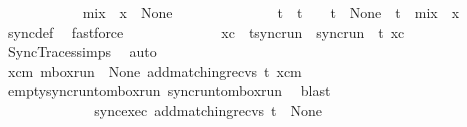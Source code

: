 \begin{isabellebody}
\ \ \ \ \ \ \ \ \ \ \isamarkupfalse%
\ {\isachardoublequoteopen}{\isacharquery}{\kern0pt}mix\ {\isasymsqdot}\ x{\isacharprime}{\kern0pt}\ {\isasymin}\ {\isasymT}\isactrlbsub None\isactrlesub {\isachardoublequoteclose}\ \isamarkupfalse%
\isanewline
\ \ \ \ \ \ \ \ \ \ \isamarkupfalse%
\ \isamarkupfalse%
\ t\ \ {\isachardoublequoteopen}t\ {\isasymin}\ {\isasymL}\isactrlsub {\isasymzero}\ {\isasymand}\ t\ {\isasymin}\ {\isasymT}\isactrlbsub None\isactrlesub {\isasymdownharpoonright}\isactrlsub {\isacharbang}{\kern0pt}\ {\isasymand}\ t\ {\isacharequal}{\kern0pt}\ {\isacharparenleft}{\kern0pt}{\isacharquery}{\kern0pt}mix\ {\isasymsqdot}\ x{\isacharprime}{\kern0pt}{\isacharparenright}{\kern0pt}{\isasymdown}\isactrlsub {\isacharbang}{\kern0pt}{\isachardoublequoteclose}\ \isamarkupfalse%
\ sync{\isacharunderscore}{\kern0pt}def\ \isamarkupfalse%
\ fastforce\isanewline
\ \ \ \ \ \ \ \ \ \ \isamarkupfalse%
\ \isamarkupfalse%
\ xc\ \ t{\isacharunderscore}{\kern0pt}sync{\isacharunderscore}{\kern0pt}run\ {\isacharcolon}{\kern0pt}\ {\isachardoublequoteopen}sync{\isacharunderscore}{\kern0pt}run\ {\isasymC}\isactrlsub {\isasymI}\isactrlsub {\isasymzero}\ t\ xc{\isachardoublequoteclose}\ \isamarkupfalse%
\ SyncTraces{\isachardot}{\kern0pt}simps\ \isamarkupfalse%
\ auto\isanewline
\ \ \ \ \ \ \ \ \ \ \ \ \ \ \isanewline
\ \ \ \ \ \ \ \ \ \ \isamarkupfalse%
\ \isamarkupfalse%
\ {\isachardoublequoteopen}{\isasymexists}xcm{\isachardot}{\kern0pt}\ mbox{\isacharunderscore}{\kern0pt}run\ {\isasymC}\isactrlsub {\isasymI}\isactrlsub {\isasymmm}\ None\ {\isacharparenleft}{\kern0pt}add{\isacharunderscore}{\kern0pt}matching{\isacharunderscore}{\kern0pt}recvs\ t{\isacharparenright}{\kern0pt}\ xcm{\isachardoublequoteclose}\ \isamarkupfalse%
\ empty{\isacharunderscore}{\kern0pt}sync{\isacharunderscore}{\kern0pt}run{\isacharunderscore}{\kern0pt}to{\isacharunderscore}{\kern0pt}mbox{\isacharunderscore}{\kern0pt}run\ sync{\isacharunderscore}{\kern0pt}run{\isacharunderscore}{\kern0pt}to{\isacharunderscore}{\kern0pt}mbox{\isacharunderscore}{\kern0pt}run\ \isamarkupfalse%
\ blast\isanewline
\ \ \ \ \ \ \ \ \ \ \ \ \ \ \isanewline
\ \ \ \ \ \ \ \ \ \ \isamarkupfalse%
\ \isamarkupfalse%
\ sync{\isacharunderscore}{\kern0pt}exec{\isacharcolon}{\kern0pt}\ {\isachardoublequoteopen}{\isacharparenleft}{\kern0pt}add{\isacharunderscore}{\kern0pt}matching{\isacharunderscore}{\kern0pt}recvs\ t{\isacharparenright}{\kern0pt}\ {\isasymin}\ {\isasymT}\isactrlbsub None\isactrlesub {\isachardoublequoteclose}\ \isamarkupfalse%

\end{isabellebody}

